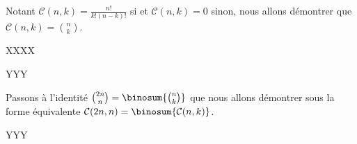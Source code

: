 Notant $\mathcal{C}(n,k) = \frac{n!}{k!(n-k)!}$ si
et $\mathcal{C}(n,k) = 0$ sinon, nous allons démontrer que $\mathcal{C}(n,k) = \binom{n}{k}$.

XXXX


%
            {\factobinomintertree}{}


YYY





Passons à l'identité $\binom{2n}{n} = \binosum{\binom{n}{k}}$ que nous allons démontrer sous la forme équivalente  $\mathcal{C}(2n,n) = \binosum{\mathcal{C}(n,k)}$.

YYY


